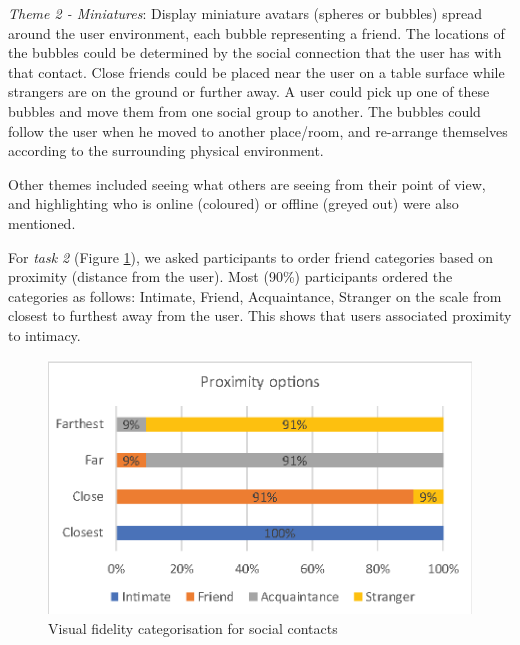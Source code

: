 \textit{Theme 2 - Miniatures}: Display miniature avatars (spheres or bubbles) spread around the user environment, each bubble representing a friend. The locations of the bubbles could be determined by the social connection that the user has with that contact. Close friends could be placed near the user on a table surface while strangers are on the ground or further away. A user could pick up one of these bubbles and move them from one social group to another. The bubbles could follow the user when he moved to another place/room, and re-arrange themselves according to the surrounding physical environment.

Other themes included seeing what others are seeing from their point of view, and highlighting who is online (coloured) or offline (greyed out) were also mentioned.



For \textit{task 2} (Figure \ref{fig:contacts:visual-fidelity}), we asked participants to order friend categories based on proximity (distance from the user). Most (90\%) participants ordered the categories as follows: Intimate, Friend, Acquaintance, Stranger on the scale from closest to furthest away from the user. This shows that users associated proximity to intimacy.

\begin{figure}[ht]
    \centering
    \includegraphics[width=.8\linewidth]{images/mgia17/analysis-images-06.eps}
    \caption{Visual fidelity categorisation for social contacts}
    \label{fig:contacts:visual-fidelity}
\end{figure}

